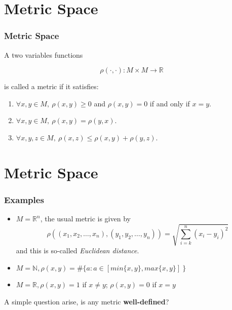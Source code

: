 \documentclass[12pt, t]{beamer}
\renewcommand{\emph}[1]{{\color{Turquoise3}\textsl{#1}}}
\begin{document}
\section{Metric Space}
\begin{frame}
    \frametitle{Metric Space}
    A two variables functions

    \begin{equation*}
        \rho(\cdot,\cdot):M\times M \rightarrow \mathbb{R}
    \end{equation*}

    is called a metric if it satisfies:

    \begin{enumerate}
        \item $\forall x,y\in M,\ \rho (x,y) \geq 0$ and $\rho (x,y)=0$ if and only if $x=y$.
        \item  $\forall x,y\in M,\ \rho (x,y)=\rho (y,x)$.
        \item  $\forall x,y,z\in M,\ \rho (x,z)\leq \rho (x,y)+\rho (y,z)$.
    \end{enumerate}


\end{frame}

\section{Metric Space}
\begin{frame}
    \frametitle{Examples}
    \begin{itemize}
        \item $M=\mathbb{R}^n$, the usual metric is given by
              \begin{equation*}
                  \rho ( (x_1,x_2,\dots,x_n), (y_1,y_2,\dots,y_n)) = \sqrt{\sum^{n}_{i=k}(x_i-y_i)^2 }
              \end{equation*}
              and this is so-called \emph{Euclidean distance}.
        \item $M=\mathbb{N}, \rho(x,y)= \#\{ a:a\in [min\{x,y\},max\{x,y\}]\ \} $
        \item $M=\mathbb{R},\rho (x,y)=1 $ if $x\neq y$; $\rho (x,y)=0$ if $x=y$
    \end{itemize}
    \vspace{1em}
    A simple question arise, is any metric \textbf{well-defined}?
\end{frame}
\end{document}
